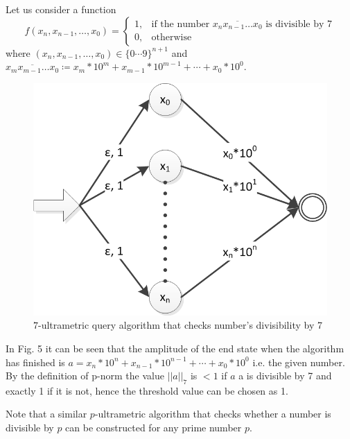 \documentclass{llncs}
\begin{document}
Let us consider a function
$$
f(x_n,x_{n-1},\dots,x_0)=\begin{cases}
1, & \text{if the number } \overline{x_nx_{n-1}\dots x_0} \text{ is divisible by 7} \\
0, & \text{otherwise}
\end{cases}
$$
where $(x_n,x_{n-1},\dots,x_0) \in \{0 \cdots 9\}^{n+1}$ and $\overline{x_mx_{m-1}\dots x_0} \coloneqq x_m*10^m+x_{m-1}*10^{m-1}+\cdots+x_0*10^0$.
\begin{figure}
	\centering
	\includegraphics{divisibility.png}
	\caption{$7$-ultrametric query algorithm that checks number's divisibility by 7}
	  \label{div}
\end{figure}

In Fig. 5 it can be seen that the amplitude of the end state when the algorithm has finished is $a=x_n*10^n+x_{n-1}*10^{n-1}+\cdots+x_0*10^0$ i.e. the given number. By the definition of p-norm the value $||a||_7$ is $<1$ if $a$ a is divisible by 7 and exactly 1 if it is not, hence the threshold value can be chosen as 1.

Note that a similar $p$-ultrametric algorithm that checks whether a number is divisible by $p$ can be constructed for any prime number $p$.
%




\end{document}
